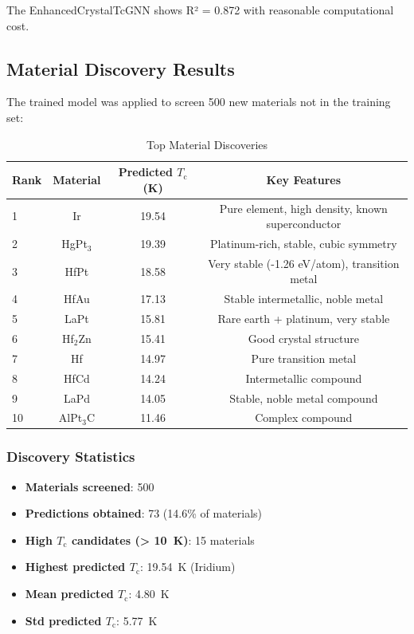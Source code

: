 \documentclass[11pt,a4paper]{article}
\begin{document}
The EnhancedCrystalTcGNN shows R² = 0.872 with reasonable computational cost.

\subsection{Material Discovery Results}

The trained model was applied to screen 500 new materials not in the training set:

\begin{table}[H]
\centering
\caption{Top Material Discoveries}
\begin{tabular}{@{}lccc@{}}
\toprule
\textbf{Rank} & \textbf{Material} & \textbf{Predicted $T_{\text{c}}$ (\si{\kelvin})} & \textbf{Key Features} \\
\midrule
1 & Ir & 19.54 & Pure element, high density, known superconductor \\
2 & HgPt$_3$ & 19.39 & Platinum-rich, stable, cubic symmetry \\
3 & HfPt & 18.58 & Very stable (-1.26 eV/atom), transition metal \\
4 & HfAu & 17.13 & Stable intermetallic, noble metal \\
5 & LaPt & 15.81 & Rare earth + platinum, very stable \\
6 & Hf$_2$Zn & 15.41 & Good crystal structure \\
7 & Hf & 14.97 & Pure transition metal \\
8 & HfCd & 14.24 & Intermetallic compound \\
9 & LaPd & 14.05 & Stable, noble metal compound \\
10 & AlPt$_3$C & 11.46 & Complex compound \\
\bottomrule
\end{tabular}
\end{table}

\subsubsection{Discovery Statistics}

\begin{itemize}
    \item \textbf{Materials screened}: 500
    \item \textbf{Predictions obtained}: 73 (14.6\% of materials)
    \item \textbf{High $T_{\text{c}}$ candidates (> \SI{10}{\kelvin})}: 15 materials
    \item \textbf{Highest predicted $T_{\text{c}}$}: \SI{19.54}{\kelvin} (Iridium)
    \item \textbf{Mean predicted $T_{\text{c}}$}: \SI{4.80}{\kelvin}
    \item \textbf{Std predicted $T_{\text{c}}$}: \SI{5.77}{\kelvin}
\end{itemize}
\end{document}
